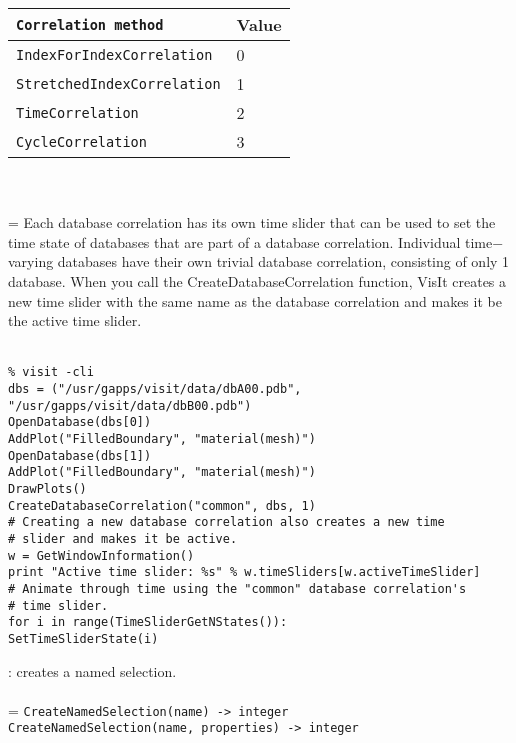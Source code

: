 \documentclass[10pt,a4paper]{report}
\begin{document}
\begin{tabular}{|l|l|}
\hline
\verb!Correlation method! & Value \\
\hline \hline
\verb!IndexForIndexCorrelation! & 0 \\
\verb!StretchedIndexCorrelation! & 1 \\
\verb!TimeCorrelation! & 2 \\
\verb!CycleCorrelation! & 3 \\
\hline
\end{tabular} \\[-2mm]
\\

\hangindent=\parindent
Each database correlation has its own time slider that can be used to set the time state of databases that are part of a database correlation. Individual time$-$varying databases have their own trivial database correlation, consisting of only 1 database. When you call the CreateDatabaseCorrelation function, VisIt creates a new time slider with the same name as the database correlation and makes it be the active time slider. \\[-3mm] 

\\[-6mm]
\begin{verbatim}% visit -cli
dbs = ("/usr/gapps/visit/data/dbA00.pdb",
"/usr/gapps/visit/data/dbB00.pdb")
OpenDatabase(dbs[0])
AddPlot("FilledBoundary", "material(mesh)")
OpenDatabase(dbs[1])
AddPlot("FilledBoundary", "material(mesh)")
DrawPlots()
CreateDatabaseCorrelation("common", dbs, 1)
# Creating a new database correlation also creates a new time 
# slider and makes it be active.
w = GetWindowInformation()
print "Active time slider: %s" % w.timeSliders[w.activeTimeSlider]
# Animate through time using the "common" database correlation's 
# time slider.
for i in range(TimeSliderGetNStates()):
SetTimeSliderState(i)
\end{verbatim}
\newpage


{}
: creates a named selection.\\[-3mm]

 \\ 
\hangindent=\parindent 
\verb!CreateNamedSelection(name) -> integer!\\ 
\verb!CreateNamedSelection(name, properties) -> integer!\\ [-3mm]
\end{document}
